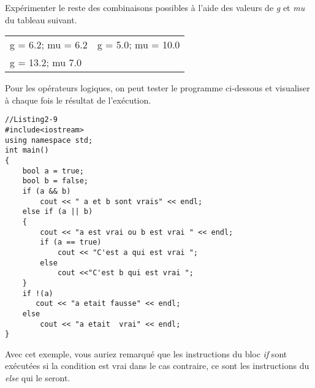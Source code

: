 \documentclass[a4paper, oneside,11pt]{book}
\begin{document}
Exp\'erimenter le reste des combinaisons possibles \`a l'aide des valeurs de \textit{g} et \textit{mu} du tableau suivant.

\begin{table}[hhhh]
\begin{center}
\begin{tabular}{|ll|}
\hline
g = 6.2; mu = 6.2 &  g = 5.0; mu = 10.0\\
g = 13.2; mu 7.0 &\\
\hline
\end{tabular}
\end{center}
\end{table}

Pour les op\'erateurs logiques, on peut tester le programme ci-dessous et visualiser \`a chaque fois le r\'esultat de l'ex\'ecution.

\begin{lstlisting}
//Listing2-9
#include<iostream>
using namespace std;
int main()
{
    bool a = true;
    bool b = false;
    if (a && b)
        cout << " a et b sont vrais" << endl;
    else if (a || b)
    {
        cout << "a est vrai ou b est vrai " << endl;
        if (a == true)
            cout << "C'est a qui est vrai ";
        else
            cout <<"C'est b qui est vrai ";
    }
    if !(a)
       cout << "a etait fausse" << endl;
    else
        cout << "a etait  vrai" << endl;
}
\end{lstlisting}

Avec cet exemple, vous auriez remarqu\'e que les instructions du bloc \textit{if} sont ex\'ecut\'ees si la condition est vrai dans le cas contraire, ce sont les 
instructions du \textit{else}  qui le seront.
\end{document}
